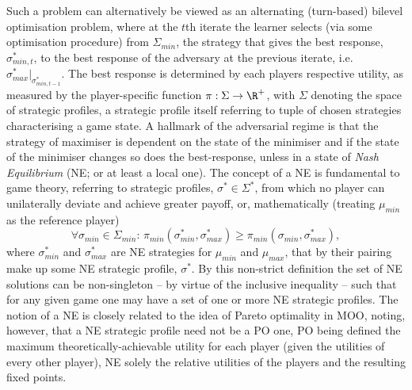 Such a problem can alternatively be viewed as an alternating (turn-based) bilevel optimisation
problem, where at the \(t\)th iterate the learner selects (via some optimisation procedure) from \(
\Sigma_{min} \), the strategy that gives the best response, \(\sigma_{min, t}^{\ast}\), to the best
response of the adversary at the previous iterate, i.e.\ \(
\sigma_{max}^\ast|_{\sigma_{min,t-1}^\ast} \).
%
%
The best response is determined by each players respective utility, as measured by the
player-specific function \(\pi: \Sigma \to \R^+\), with \(\Sigma\) denoting the space of strategic
profiles, a strategic profile itself referring to tuple of chosen strategies characterising a game
state.
%
A hallmark of the adversarial regime is that the strategy of maximiser is dependent on the
state of the minimiser and if the state of the minimiser changes so does the best-response, unless 
in a state of \emph{Nash Equilibrium} (NE; or at least a local one).  
%
%
The concept of a NE is fundamental to game theory, referring to strategic profiles, \(\sigma^\ast \in
\Sigma^\ast\), from which no player can unilaterally deviate and achieve greater payoff, or,
mathematically (treating \(\mu_{min}\) as the reference player)
%
\begin{equation}
  \forall \sigma_{min} \in \Sigma_{min}:\, \pi_{min} ( \sigma^\ast_{min}, \sigma^\ast_{max} ) \ge \pi_{min}(
  \sigma_{min}, \sigma^\ast_{max} ),
\end{equation}
%
where \(\sigma^\ast_{min}\) and \(\sigma^\ast_{max} \) are NE strategies for \(\mu_{min}\) and \( \mu_{max}
\), that by their pairing make up some NE strategic profile, \(\sigma^\ast\).
%
%
By this non-strict definition the set of NE solutions can be non-singleton -- by virtue of the
inclusive inequality -- such that for any given game one may have a set of one or more NE strategic
profiles.
%
The notion of a NE is closely related to the idea of Pareto optimality in MOO, noting, however,
that a NE strategic profile need not be a \ac{PO} one, \ac{PO} being defined \wrt{} the maximum
theoretically-achievable utility for each player (given the utilities of every other player), NE
solely \wrt{} the relative utilities of the players and the resulting fixed points.

